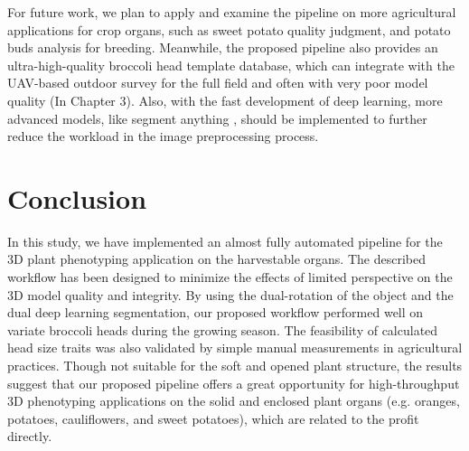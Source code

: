 For future work, we plan to apply and examine the pipeline on more agricultural applications for crop organs, such as sweet potato quality judgment, and potato buds analysis for breeding. Meanwhile, the proposed pipeline also provides an ultra-high-quality broccoli head template database, which can integrate with the UAV-based outdoor survey for the full field and often with very poor model quality (In Chapter 3). Also, with the fast development of deep learning, more advanced models, like segment anything \citep{kirillov_segany_2023}, should be implemented to further reduce the workload in the image preprocessing process.

\section{Conclusion}

In this study, we have implemented an almost fully automated pipeline for the 3D plant phenotyping application on the harvestable organs. The described workflow has been designed to minimize the effects of limited perspective on the 3D model quality and integrity. By using the dual-rotation of the object and the dual deep learning segmentation, our proposed workflow performed well on variate broccoli heads during the growing season. The feasibility of calculated head size traits was also validated by simple manual measurements in agricultural practices. Though not suitable for the soft and opened plant structure, the results suggest that our proposed pipeline offers a great opportunity for high-throughput 3D phenotyping applications on the solid and enclosed plant organs (e.g. oranges, potatoes, cauliflowers, and sweet potatoes), which are related to the profit directly.